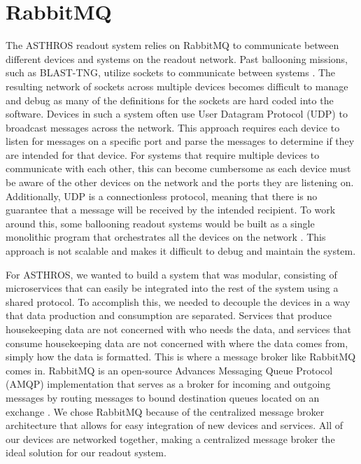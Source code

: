 \section{RabbitMQ}
\label{readout/section:rmqtools}
The ASTHROS readout system relies on RabbitMQ to communicate between different devices and systems on the readout network.
Past ballooning missions, such as BLAST-TNG, utilize sockets to communicate between systems \parencite{gordon2019highly}.
The resulting network of sockets across multiple devices becomes difficult to manage and debug as many of the definitions for the sockets are hard coded into the software.
Devices in such a system often use User Datagram Protocol (UDP) to broadcast messages across the network.
This approach requires each device to listen for messages on a specific port and parse the messages to determine if they are intended for that device.
For systems that require multiple devices to communicate with each other, this can become cumbersome as each device must be aware of the other devices on the network and the ports they are listening on.
Additionally, UDP is a connectionless protocol, meaning that there is no guarantee that a message will be received by the intended recipient.
To work around this, some ballooning readout systems would be built as a single monolithic program that orchestrates all the devices on the network \parencite{gordon2019highly}.
This approach is not scalable and makes it difficult to debug and maintain the system.

For ASTHROS, we wanted to build a system that was modular, consisting of microservices that can easily be integrated into the rest of the system using a shared protocol.
To accomplish this, we needed to decouple the devices in a way that data production and consumption are separated.
Services that produce housekeeping data are not concerned with who needs the data, and services that consume housekeeping data are not concerned with where the data comes from, simply how the data is formatted. 
This is where a message broker like RabbitMQ comes in.
RabbitMQ is an open-source Advances Messaging Queue Protocol (AMQP) implementation that serves as a broker for incoming and outgoing messages by routing messages to bound destination queues located on an exchange \parencite{dunne2018comparison}.
We chose RabbitMQ because of the centralized message broker architecture that allows for easy integration of new devices and services.
All of our devices are networked together, making a centralized message broker the ideal solution for our readout system.

